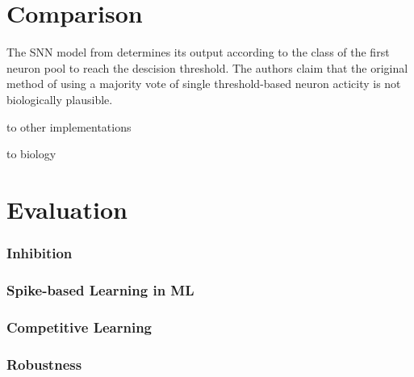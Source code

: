 \section{Comparison}
\label{sec:comparison}

The \ac{SNN} model from \cite{STDP_like} determines its output according to the class of the first neuron pool to reach the descision threshold.
The authors claim that the original method of using a majority vote of single threshold-based neuron acticity is not biologically plausible.


to other implementations

to biology


\section{Evaluation}
\label{sec:evaluation}

\subsubsection{Inhibition}

\subsubsection{Spike-based Learning in ML}

\subsubsection{Competitive Learning}

\subsubsection{Robustness}
